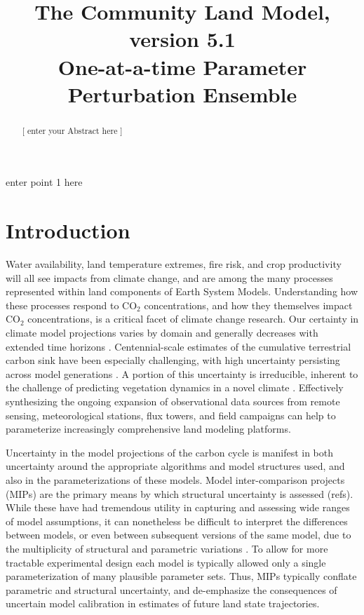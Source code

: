 \documentclass[draft]{agujournal2019}
\begin{document}
\title{The Community Land Model, version 5.1 \\ One-at-a-time Parameter Perturbation Ensemble}



\begin{keypoints}
\item enter point 1 here
\end{keypoints}

\begin{abstract}
[ enter your Abstract here ]
\end{abstract}


\section{Introduction}
Water availability, land temperature extremes, fire risk, and crop productivity will all see impacts from climate change, and are among the many processes represented within land components of Earth System Models.
Understanding how these processes respond to CO$_2$ concentrations, and how they themselves impact CO$_2$ concentrations, is a critical facet of climate change research.  
Our certainty in climate model projections varies by domain and generally decreases with extended time horizons \cite{koven2022}.
Centennial-scale estimates of the cumulative terrestrial carbon sink have been especially challenging, with high uncertainty persisting across model generations \cite{friedlingstein2014,arora2020}. 
A portion of this uncertainty is irreducible, inherent to the challenge of predicting vegetation dynamics in a novel climate \cite{lovenduski2017}. Effectively synthesizing the ongoing expansion of observational data sources from remote sensing, meteorological stations, flux towers, and field campaigns can help to parameterize increasingly comprehensive land modeling platforms. 

Uncertainty in the model projections of the carbon cycle is manifest in both uncertainty around the appropriate algorithms and model structures used, and also in the parameterizations of these models. Model inter-comparison projects (MIPs) are the primary means by which structural uncertainty is assessed (refs). While these have had tremendous utility in capturing and assessing wide ranges of model assumptions, it can nonetheless be difficult to interpret the differences between models, or even between subsequent versions of the same model, due to the multiplicity of structural and parametric variations \cite{mcneall2016}. To allow for more tractable experimental design each model is typically allowed only a single parameterization of many plausible parameter sets. Thus, MIPs typically conflate parametric and structural uncertainty, and de-emphasize the consequences of uncertain model calibration in estimates of future land state trajectories. 
\end{document}
